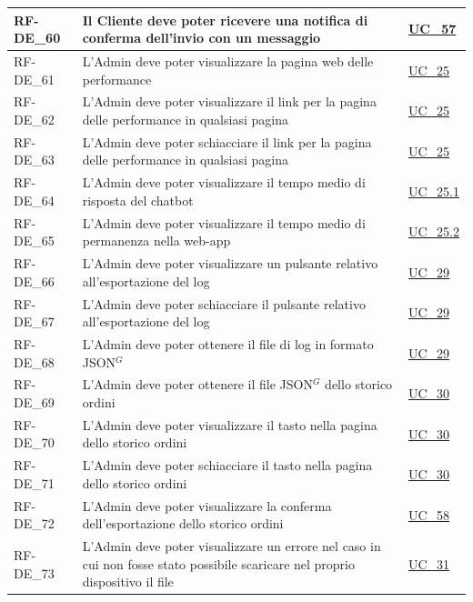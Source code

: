 \begin{longtable}{|>{\raggedright}p{}|>{\raggedright\arraybackslash}p{}|>{\raggedright\arraybackslash}p{}|}
	\hline
	RF-DE\_60 \hypertarget{rf-de_60} & Il Cliente deve poter ricevere una notifica di conferma dell'invio con un messaggio \vr{Ticket creato con successo} & \hyperref[uc_57]{UC\_57} \\
	\hline
	RF-DE\_61 \hypertarget{rf-de_61} & L'Admin deve poter visualizzare la pagina web delle performance & \hyperref[uc_25]{UC\_25} \\
	\hline
	RF-DE\_62 \hypertarget{rf-de_62} & L'Admin deve poter visualizzare il link per la pagina delle performance in qualsiasi pagina & \hyperref[uc_25]{UC\_25} \\
	\hline
	RF-DE\_63 \hypertarget{rf-de_63} & L'Admin deve poter schiacciare il link per la pagina delle performance in qualsiasi pagina & \hyperref[uc_25]{UC\_25} \\
	\hline
	RF-DE\_64 \hypertarget{rf-de_64} & L'Admin deve poter visualizzare il tempo medio di risposta del chatbot & \hyperref[uc_25.1]{UC\_25.1} \\
	\hline
	RF-DE\_65 \hypertarget{rf-de_65} & L'Admin deve poter visualizzare il tempo medio di permanenza nella web-app & \hyperref[uc_25.2]{UC\_25.2} \\
	\hline
	RF-DE\_66 \hypertarget{rf-de_66} & L'Admin deve poter visualizzare un pulsante relativo all'esportazione del log & \hyperref[uc_29]{UC\_29} \\
	\hline
	RF-DE\_67 \hypertarget{rf-de_67} & L'Admin deve poter schiacciare il pulsante relativo all'esportazione del log & \hyperref[uc_29]{UC\_29} \\
	\hline
	RF-DE\_68 \hypertarget{rf-de_68} & L'Admin deve poter ottenere il file di log in formato JSON$^G$ & \hyperref[uc_29]{UC\_29} \\
	\hline
	RF-DE\_69 \hypertarget{rf-de_69} & L'Admin deve poter ottenere il file JSON$^G$ dello storico ordini & \hyperref[uc_30]{UC\_30} \\
	\hline
	RF-DE\_70 \hypertarget{rf-de_70} & L'Admin deve poter visualizzare il tasto \vr{Esporta} nella pagina dello storico ordini & \hyperref[uc_30]{UC\_30} \\
	\hline
	RF-DE\_71 \hypertarget{rf-de_71} & L'Admin deve poter schiacciare il tasto \vr{Esporta} nella pagina dello storico ordini & \hyperref[uc_30]{UC\_30} \\
	\hline
	RF-DE\_72 \hypertarget{rf-de_72} & L'Admin deve poter visualizzare la conferma dell'esportazione dello storico ordini & \hyperref[uc_58]{UC\_58} \\
	\hline
	RF-DE\_73 \hypertarget{rf-de_73} & L'Admin deve poter visualizzare un errore nel caso in cui non fosse stato possibile scaricare nel proprio dispositivo il file & \hyperref[uc_31]{UC\_31} \\

\end{longtable}
